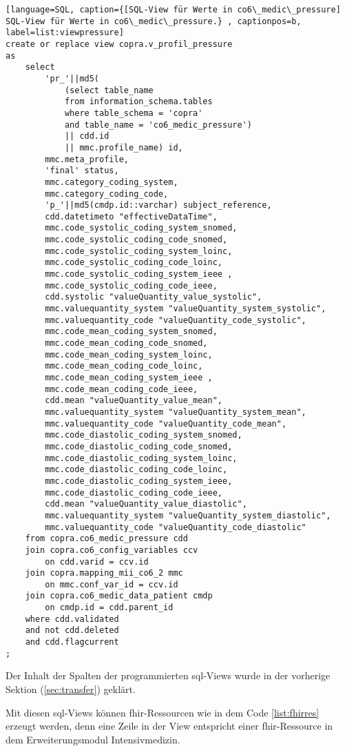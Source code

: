 \begin{lstlisting}[language=SQL, caption={[SQL-View für Werte in co6\_medic\_pressure] SQL-View für Werte in co6\_medic\_pressure.} , captionpos=b, label=list:viewpressure]
create or replace view copra.v_profil_pressure 
as
	select 
		'pr_'||md5(
			(select table_name 
			from information_schema.tables 
			where table_schema = 'copra'
			and table_name = 'co6_medic_pressure') 
			|| cdd.id 
			|| mmc.profile_name) id,
		mmc.meta_profile,
		'final' status,
		mmc.category_coding_system,
		mmc.category_coding_code,  
		'p_'||md5(cmdp.id::varchar) subject_reference,
		cdd.datetimeto "effectiveDataTime",
		mmc.code_systolic_coding_system_snomed,
		mmc.code_systolic_coding_code_snomed,
		mmc.code_systolic_coding_system_loinc,
		mmc.code_systolic_coding_code_loinc,
		mmc.code_systolic_coding_system_ieee ,
		mmc.code_systolic_coding_code_ieee,
		cdd.systolic "valueQuantity_value_systolic",
		mmc.valuequantity_system "valueQuantity_system_systolic",
		mmc.valuequantity_code "valueQuantity_code_systolic",
		mmc.code_mean_coding_system_snomed,
		mmc.code_mean_coding_code_snomed,
		mmc.code_mean_coding_system_loinc,
		mmc.code_mean_coding_code_loinc,
		mmc.code_mean_coding_system_ieee ,
		mmc.code_mean_coding_code_ieee,
		cdd.mean "valueQuantity_value_mean",
		mmc.valuequantity_system "valueQuantity_system_mean",
		mmc.valuequantity_code "valueQuantity_code_mean",
		mmc.code_diastolic_coding_system_snomed,
		mmc.code_diastolic_coding_code_snomed,
		mmc.code_diastolic_coding_system_loinc,
		mmc.code_diastolic_coding_code_loinc,
		mmc.code_diastolic_coding_system_ieee,
		mmc.code_diastolic_coding_code_ieee,
		cdd.mean "valueQuantity_value_diastolic",
		mmc.valuequantity_system "valueQuantity_system_diastolic",
		mmc.valuequantity_code "valueQuantity_code_diastolic"
	from copra.co6_medic_pressure cdd 
	join copra.co6_config_variables ccv 
		on cdd.varid = ccv.id 
	join copra.mapping_mii_co6_2 mmc 
		on mmc.conf_var_id = ccv.id 
	join copra.co6_medic_data_patient cmdp 
		on cmdp.id = cdd.parent_id 
	where cdd.validated 
	and not cdd.deleted 
	and cdd.flagcurrent
;
\end{lstlisting}

Der Inhalt der Spalten der programmierten \ac{sql}-Views wurde in der vorherige Sektion (\ref{sec:transfer}) geklärt. 

Mit diesen \ac{sql}-Views können \ac{fhir}-Ressourcen wie in dem Code \ref{list:fhirres} erzeugt werden, denn eine Zeile in der View entspricht einer \ac{fhir}-Ressource in dem Erweiterungsmodul \glqq Intensivmedizin\grqq{}.

